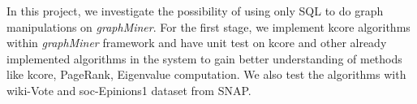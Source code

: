 In this project, we investigate the possibility of using only SQL to do graph manipulations
on {\em graphMiner}. For the first stage, we implement kcore algorithms within 
{\em graphMiner} framework and have unit test on kcore and other already implemented algorithms in the system
to gain better understanding of methods like kcore, PageRank, Eigenvalue computation. We also test the algorithms
with wiki-Vote and soc-Epinions1 dataset from SNAP.
